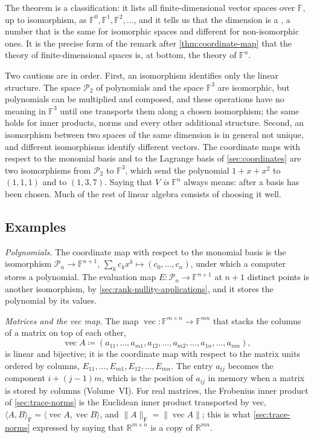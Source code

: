 The theorem is a classification: it lists all finite-dimensional vector spaces over $\mathbb F$, up to isomorphism, as $\mathbb F^0,\mathbb F^1,\mathbb F^2,\ldots$, and it tells us that the dimension is a , a number that is the same for isomorphic spaces and different for non-isomorphic ones. It is the precise form of the remark after \cref{thm:coordinate-map} that the theory of finite-dimensional spaces is, at bottom, the theory of $\mathbb F^n$.

Two cautions are in order. First, an isomorphism identifies only the linear structure. The space $\mathcal P_2$ of polynomials and the space $\mathbb F^3$ are isomorphic, but polynomials can be multiplied and composed, and these operations have no meaning in $\mathbb F^3$ until one transports them along a chosen isomorphism; the same holds for inner products, norms and every other additional structure. Second, an isomorphism between two spaces of the same dimension is in general not unique, and different isomorphisms identify different vectors. The coordinate maps with respect to the monomial basis and to the Lagrange basis of \cref{sec:coordinates} are two isomorphisms from $\mathcal P_2$ to $\mathbb F^3$, which send the polynomial $1+x+x^2$ to $(1,1,1)$ and to $(1,3,7)$. Saying that $V$ \emph{is} $\mathbb F^n$ always means: after a basis has been chosen. Much of the rest of linear algebra consists of choosing it well.

\subsection{Examples}

\emph{Polynomials.} The coordinate map with respect to the monomial basis is the isomorphism $\mathcal P_n\to\mathbb F^{n+1}$, $\sum_kc_kx^k\mapsto(c_0,\ldots,c_n)$, under which a computer stores a polynomial. The evaluation map $E\colon\mathcal P_n\to\mathbb F^{n+1}$ at $n+1$ distinct points is another isomorphism, by \cref{sec:rank-nullity-applications}, and it stores the polynomial by its values.

\emph{Matrices and the vec map.} The map $\operatorname{vec}\colon\mathbb F^{m\times n}\to\mathbb F^{mn}$ that stacks the columns of a matrix on top of each other,
\[
\operatorname{vec}A\coloneqq(a_{11},\ldots,a_{m1},a_{12},\ldots,a_{m2},\ldots,a_{1n},\ldots,a_{mn}),
\]
is linear and bijective; it is the coordinate map with respect to the matrix units ordered by columns, $E_{11},\ldots,E_{m1},E_{12},\ldots,E_{mn}$. The entry $a_{ij}$ becomes the component $i+(j-1)m$, which is the position of $a_{ij}$ in memory when a matrix is stored by columns (Volume~VI). For real matrices, the Frobenius inner product of \cref{sec:trace-norms} is the Euclidean inner product transported by vec, $\langle A,B\rangle_{\mathrm F}=\langle\operatorname{vec}A,\operatorname{vec}B\rangle$, and $\|A\|_{\mathrm F}=\|\operatorname{vec}A\|$; this is what \cref{sec:trace-norms} expressed by saying that $\mathbb R^{m\times n}$ is a copy of $\mathbb R^{mn}$.

